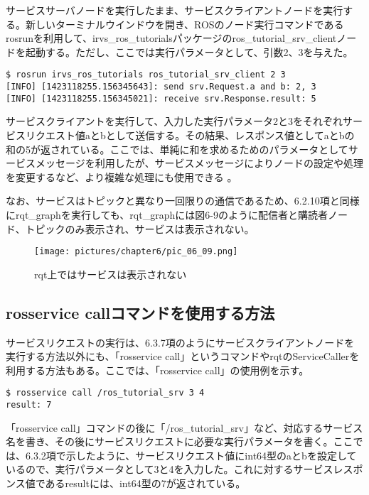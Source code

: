 サービスサーバノードを実行したまま、サービスクライアントノードを実行する。新しいターミナルウインドウを開き、ROSのノード実行コマンドであるrosrunを利用して、irvs\_ros\_tutorialsパッケージのros\_tutorial\_srv\_clientノードを起動する。ただし、ここでは実行パラメータとして、引数2、3を与えた。

\begin{lstlisting}[language=ROS]
$ rosrun irvs_ros_tutorials ros_tutorial_srv_client 2 3
[INFO] [1423118255.156345643]: send srv.Request.a and b: 2, 3
[INFO] [1423118255.156345021]: receive srv.Response.result: 5
\end{lstlisting}

サービスクライアントを実行して、入力した実行パラメータ2と3をそれぞれサービスリクエスト値aとbとして送信する。その結果、レスポンス値としてaとbの和の5が返されている。ここでは、単純に和を求めるためのパラメータとしてサービスメッセージを利用したが、サービスメッセージによりノードの設定や処理を変更するなど、より複雑な処理にも使用できる  。

なお、サービスはトピックと異なり一回限りの通信であるため、6.2.10項と同様にrqt\_graphを実行しても、rqt\_graphには図6-9のように配信者と購読者ノード、トピックのみ表示され、サービスは表示されない。

\begin{figure}[h]
  \centering
  \texttt{[image: pictures/chapter6/pic\_06\_09.png]}
  \caption{rqt上ではサービスは表示されない}
\end{figure}

\subsection{rosservice callコマンドを使用する方法}

サービスリクエストの実行は、6.3.7項のようにサービスクライアントノードを実行する方法以外にも、「rosservice call」というコマンドやrqtのServiceCallerを利用する方法もある。ここでは、「rosservice call」の使用例を示す。

\begin{lstlisting}[language=ROS]
$ rosservice call /ros_tutorial_srv 3 4
result: 7
\end{lstlisting}

「rosservice call」コマンドの後に「/ros\_tutorial\_srv」など、対応するサービス名を書き、その後にサービスリクエストに必要な実行パラメータを書く。ここでは、6.3.2項で示したように、サービスリクエスト値にint64型のaとbを設定しているので、実行パラメータとして3と4を入力した。これに対するサービスレスポンス値であるresultには、int64型の7が返されている。

